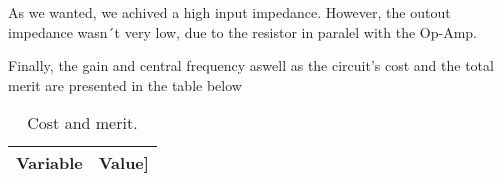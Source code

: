 As we wanted, we achived a high input impedance. However, the outout impedance wasn´t very low, due to the resistor in paralel with the Op-Amp.
\par
Finally, the gain and central frequency aswell as the circuit's cost and the total merit are presented in the table below

\begin{table}[H]
  \centering
  \begin{tabular}{|l|r|}
    \hline    
    {\bf Variable} & {\bf Value]} \\ \hline
    
  \end{tabular}
  \caption{Cost and merit.}
\end{table}



